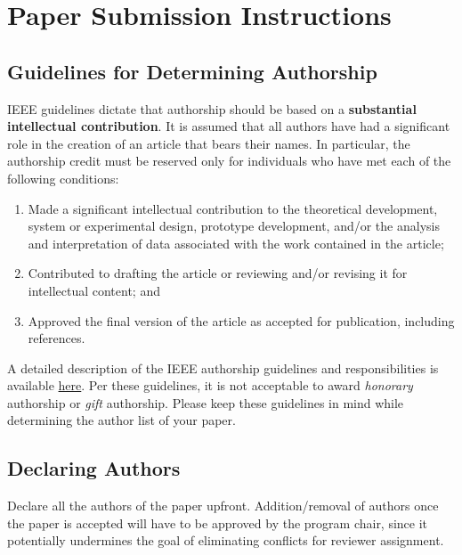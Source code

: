 \documentclass{sig-alternate}
\begin{document}
\section{Paper Submission Instructions}

\subsection{Guidelines for Determining Authorship}


IEEE guidelines dictate that authorship should be based on a {\bf
  substantial intellectual contribution}. It is assumed that all
authors have had a significant role in the creation of an article that
bears their names. In particular, the authorship credit must be
reserved only for individuals who have met each of the following
conditions:

\begin{enumerate}

\item Made a significant intellectual contribution to the theoretical
  development, system or experimental design, prototype development,
  and/or the analysis and interpretation of data associated with the
  work contained in the article;

\item Contributed to drafting the article or reviewing and/or revising
  it for intellectual content; and

\item Approved the final version of the article as accepted for
  publication, including references.

\end{enumerate}

A detailed description of the IEEE authorship guidelines and
responsibilities is available
\href{https://www.ieee.org/publications_standards/publications/rights/Section821.html}{here}.
Per these guidelines, it is not acceptable to award {\em honorary }
authorship or {\em gift} authorship. Please keep these guidelines in
mind while determining the author list of your paper.


\subsection{Declaring Authors}

Declare all the authors of the paper upfront. Addition/removal of authors
once the paper is accepted will have to be approved by the program chair,
since it potentially undermines the goal of eliminating conflicts for
reviewer assignment.
\end{document}
